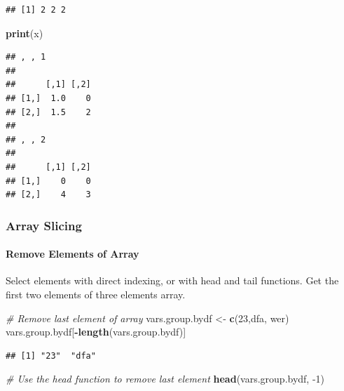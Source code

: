 \documentclass[
]{book}
\newenvironment{Shaded}{\begin{snugshade}}{\end{snugshade}}
\newcommand{\CommentTok}[1]{\textcolor[rgb]{0.56,0.35,0.01}{\textit{#1}}}
\newcommand{\DecValTok}[1]{\textcolor[rgb]{0.00,0.00,0.81}{#1}}
\newcommand{\KeywordTok}[1]{\textcolor[rgb]{0.13,0.29,0.53}{\textbf{#1}}}
\newcommand{\NormalTok}[1]{#1}
\newcommand{\OperatorTok}[1]{\textcolor[rgb]{0.81,0.36,0.00}{\textbf{#1}}}
\newcommand{\StringTok}[1]{\textcolor[rgb]{0.31,0.60,0.02}{#1}}
\begin{document}
\begin{verbatim}
## [1] 2 2 2
\end{verbatim}

\begin{Shaded}
\begin{Highlighting}[]
\KeywordTok{print}\NormalTok{(x)}
\end{Highlighting}
\end{Shaded}

\begin{verbatim}
## , , 1
## 
##      [,1] [,2]
## [1,]  1.0    0
## [2,]  1.5    2
## 
## , , 2
## 
##      [,1] [,2]
## [1,]    0    0
## [2,]    4    3
\end{verbatim}

\hypertarget{array-slicing}{%
\subsubsection{Array Slicing}\label{array-slicing}}

\hypertarget{remove-elements-of-array}{%
\paragraph{Remove Elements of Array}\label{remove-elements-of-array}}

Select elements with direct indexing, or with head and tail functions. Get the first two elements of three elements array.

\begin{Shaded}
\begin{Highlighting}[]
\CommentTok{\# Remove last element of array}
\NormalTok{vars.group.bydf \textless{}{-}}\StringTok{ }\KeywordTok{c}\NormalTok{(}\StringTok{\textquotesingle{}23\textquotesingle{}}\NormalTok{,}\StringTok{\textquotesingle{}dfa\textquotesingle{}}\NormalTok{, }\StringTok{\textquotesingle{}wer\textquotesingle{}}\NormalTok{)}
\NormalTok{vars.group.bydf[}\OperatorTok{{-}}\KeywordTok{length}\NormalTok{(vars.group.bydf)]}
\end{Highlighting}
\end{Shaded}

\begin{verbatim}
## [1] "23"  "dfa"
\end{verbatim}

\begin{Shaded}
\begin{Highlighting}[]
\CommentTok{\# Use the head function to remove last element}
\KeywordTok{head}\NormalTok{(vars.group.bydf, }\DecValTok{{-}1}\NormalTok{)}
\end{Highlighting}
\end{Shaded}
\end{document}
